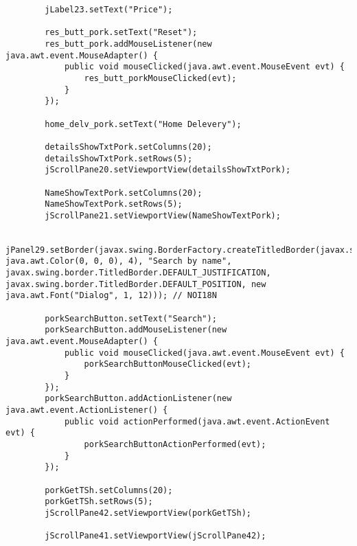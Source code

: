 \documentclass[12pt,a4paper]{article}
\begin{document}
\begin{lstlisting}
        jLabel23.setText("Price");

        res_butt_pork.setText("Reset");
        res_butt_pork.addMouseListener(new java.awt.event.MouseAdapter() {
            public void mouseClicked(java.awt.event.MouseEvent evt) {
                res_butt_porkMouseClicked(evt);
            }
        });

        home_delv_pork.setText("Home Delevery");

        detailsShowTxtPork.setColumns(20);
        detailsShowTxtPork.setRows(5);
        jScrollPane20.setViewportView(detailsShowTxtPork);

        NameShowTextPork.setColumns(20);
        NameShowTextPork.setRows(5);
        jScrollPane21.setViewportView(NameShowTextPork);

        jPanel29.setBorder(javax.swing.BorderFactory.createTitledBorder(javax.swing.BorderFactory.createLineBorder(new java.awt.Color(0, 0, 0), 4), "Search by name", javax.swing.border.TitledBorder.DEFAULT_JUSTIFICATION, javax.swing.border.TitledBorder.DEFAULT_POSITION, new java.awt.Font("Dialog", 1, 12))); // NOI18N

        porkSearchButton.setText("Search");
        porkSearchButton.addMouseListener(new java.awt.event.MouseAdapter() {
            public void mouseClicked(java.awt.event.MouseEvent evt) {
                porkSearchButtonMouseClicked(evt);
            }
        });
        porkSearchButton.addActionListener(new java.awt.event.ActionListener() {
            public void actionPerformed(java.awt.event.ActionEvent evt) {
                porkSearchButtonActionPerformed(evt);
            }
        });

        porkGetTSh.setColumns(20);
        porkGetTSh.setRows(5);
        jScrollPane42.setViewportView(porkGetTSh);

        jScrollPane41.setViewportView(jScrollPane42);


\end{lstlisting}
\end{document}
